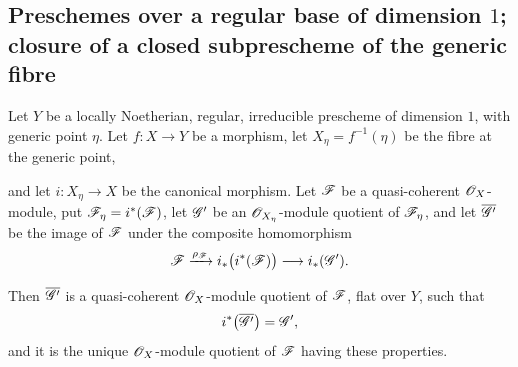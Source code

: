 \subsection{Preschemes over a regular base of dimension
\texorpdfstring{$1$}{1}; closure of a closed subprescheme of the generic
fibre}
\label{subsection:IV.2.8}

\begin{proposition}[2.8.1]
\label{IV.2.8.1}
Let $Y$ be a locally Noetherian, regular, irreducible prescheme of
dimension $1$, with generic point $\eta$. Let $f:X\to Y$ be a
morphism, let $X_\eta=f^{-1}(\eta)$ be the fibre at the generic point,


and let $i:X_\eta\to X$ be the canonical morphism. Let $\mathscr{F}$ be a
quasi-coherent $\mathscr{O}_X$-module, put
$\mathscr{F}_\eta=i^*(\mathscr{F})$, let $\mathscr{G}'$ be an
$\mathscr{O}_{X_\eta}$-module quotient of $\mathscr{F}_\eta$, and let
$\overline{\mathscr{G}'}$ be the image of $\mathscr{F}$ under the composite
homomorphism~
\[
  \mathscr{F}
    \xrightarrow{\rho_{\mathscr{F}}}
  i_*\bigl(i^*(\mathscr{F})\bigr)
    \longrightarrow
  i_*(\mathscr{G}').
\]

Then $\overline{\mathscr{G}'}$ is a quasi-coherent
$\mathscr{O}_X$-module quotient of $\mathscr{F}$, flat over $Y$, such that
\[
  i^*\bigl(\overline{\mathscr{G}'}\bigr)=\mathscr{G}',
\]
and it is the unique $\mathscr{O}_X$-module quotient of $\mathscr{F}$ having
these properties.
\end{proposition}

